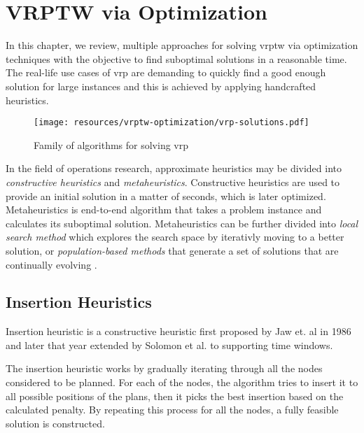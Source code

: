 \chapter{VRPTW via Optimization}
In this chapter, we review, multiple approaches for solving \gls{vrptw} via optimization techniques with the objective to find suboptimal solutions in a reasonable time. The real-life use cases of \gls{vrp} are demanding to quickly find a good enough solution for large instances and this is achieved by applying handcrafted heuristics.

\begin{figure}[ht]
    \centering
    \texttt{[image: resources/vrptw-optimization/vrp-solutions.pdf]}
    \caption{Family of algorithms for solving \gls{vrp}}
    \label{fig:vrp-graph}
\end{figure}

In the field of operations research, approximate heuristics may be divided into \emph{constructive heuristics} and \emph{metaheuristics}. Constructive heuristics are used to provide an initial solution in a matter of seconds, which is later optimized. Metaheuristics is end-to-end algorithm that takes a problem instance and calculates its suboptimal solution. Metaheuristics can be further divided into \emph{local search method} which explores the search space by iterativly moving to a better solution, or \emph{population-based methods} that generate a set of solutions that are continually evolving \cite{vrp-bible}.

\section{Insertion Heuristics}\label{insertion-heuristics}
Insertion heuristic is a constructive heuristic first proposed by Jaw et. al \cite{i1-heuristics} in 1986 and later that year extended by Solomon et al. \cite{solomon-insertion-tw} to supporting time windows.

The insertion heuristic works by gradually iterating through all the nodes considered to be planned. For each of the nodes, the algorithm tries to insert it to all possible positions of the plans, then it picks the best insertion based on the calculated penalty. By repeating this process for all the nodes, a fully feasible solution is constructed.\newline

